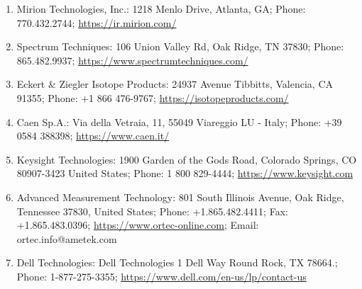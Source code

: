 \documentclass[12pt]{article}
\begin{document}
\begin{table}[!h]
\begin{tabular}{c|cccc}
    \end{tabular}
    \begin{enumerate}[label=\alph*]
        \item\label{addr:mirion}
        Mirion Technologies, Inc.:
        1218 Menlo Drive,
        Atlanta, GA;
        Phone: 770.432.2744;
        \url{https://ir.mirion.com/}
        \item\label{addr:spect}
        Spectrum Techniques:
        106 Union Valley Rd, Oak Ridge, TN 37830;
        Phone: 865.482.9937;
        \url{https://www.spectrumtechniques.com/}
        \item\label{addr:eck-zieg}
        Eckert \& Ziegler Isotope Products:
        24937 Avenue Tibbitts, Valencia, CA 91355;
        Phone: +1 866 476-9767;
        \url{https://isotopeproducts.com/}
        \item\label{addr:caen}
        Caen Sp.A.:
        Via della Vetraia, 11, 55049 Viareggio LU - Italy;
        Phone: +39 0584 388398;
        \url{https://www.caen.it/}
        \item\label{addr:keys}
        Keysight Technologies: 
        1900 Garden of the Gods Road, Colorado Springs, CO 80907-3423 United States;
        Phone: 1 800 829-4444;
        \url{https://www.keysight.com}
        \item\label{addr:ortec}
        Advanced Measurement Technology:
        801 South Illinois Avenue,
        Oak Ridge, Tennessee 37830,
        United States;
        Phone: +1.865.482.4411;
        Fax: +1.865.483.0396;
        \url{https://www.ortec-online.com};
        Email: ortec.info@ametek.com
        \item\label{addr:dell}
        Dell Technologies:
        Dell Technologies
        1 Dell Way
        Round Rock, TX 78664.;
        Phone: 1-877-275-3355;
        \url{https://www.dell.com/en-us/lp/contact-us}
    \end{enumerate}
\end{table}
\FloatBarrier
\end{document}
